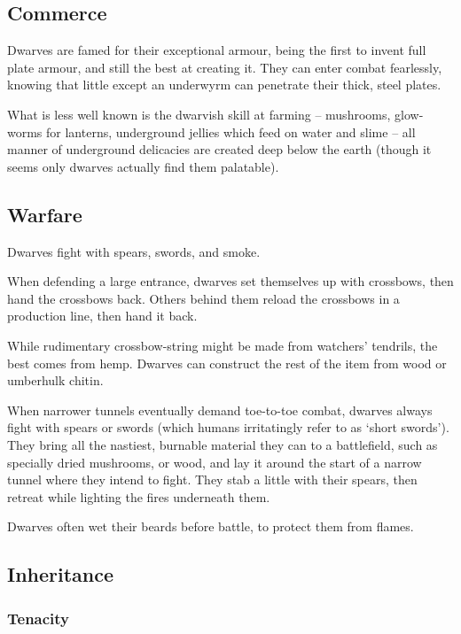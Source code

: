 \begin{multicols}{2}
\subsection{Commerce}

Dwarves are famed for their exceptional armour, being the first to invent full plate armour, and still the best at creating it.
They can enter combat fearlessly, knowing that little except an underwyrm can penetrate their thick, steel plates.

What is less well known is the dwarvish skill at farming -- mushrooms, glow-worms for lanterns, underground jellies which feed on water and slime -- all manner of underground delicacies are created deep below the earth (though it seems only dwarves actually find them palatable).

\subsection{Warfare}

Dwarves fight with spears, swords, and smoke.

When defending a large entrance, dwarves set themselves up with crossbows, then hand the crossbows back.
Others behind them reload the crossbows in a production line, then hand it back.

While rudimentary crossbow-string might be made from watchers' tendrils, the best comes from hemp.
Dwarves can construct the rest of the item from wood or umberhulk chitin.

When narrower tunnels eventually demand toe-to-toe combat, dwarves always fight with spears or swords (which humans irritatingly refer to as `short swords').
They bring all the nastiest, burnable material they can to a battlefield, such as specially dried mushrooms, or wood, and lay it around the start of a narrow tunnel where they intend to fight.
They stab a little with their spears, then retreat while lighting the fires underneath them.

Dwarves often wet their beards before battle, to protect them from flames.

\subsection{Inheritance}

\subsubsection[Tenacity: dwarves take only half the usual penalties from rotten food, poisons, or foul air.]{Tenacity}
\label{dwarvenInheritance}


\end{multicols}
